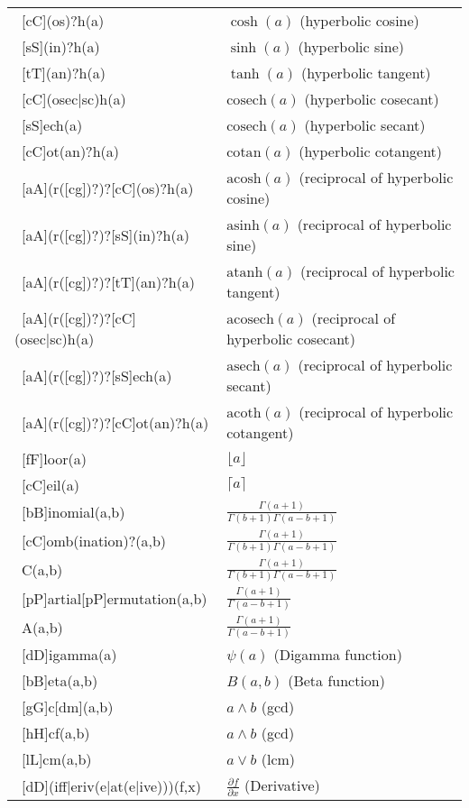 \begin{longtable}{ll}
    \ [cC](os)?h(a) & $\cosh(a)$ (hyperbolic cosine)\\
    \ [sS](in)?h(a) & $\sinh(a)$ (hyperbolic sine)\\
    \ [tT](an)?h(a) & $\tanh(a)$ (hyperbolic tangent)\\
    \ [cC](osec|sc)h(a) & $\mathrm{cosech}(a)$ (hyperbolic cosecant) \\
    \ [sS]ech(a) & $\mathrm{cosech}(a)$ (hyperbolic secant) \\
    \ [cC]ot(an)?h(a) & $\mathrm{cotan}(a)$ (hyperbolic cotangent) \\
    \ [aA](r([cg])?)?[cC](os)?h(a) & $\mathrm{acosh}(a)$ (reciprocal of hyperbolic cosine) \\
    \ [aA](r([cg])?)?[sS](in)?h(a) & $\mathrm{asinh}(a)$ (reciprocal of hyperbolic sine) \\
    \ [aA](r([cg])?)?[tT](an)?h(a) & $\mathrm{atanh}(a)$ (reciprocal of hyperbolic tangent) \\
    \ [aA](r([cg])?)?[cC](osec|sc)h(a) & $\mathrm{acosech}(a)$ (reciprocal of hyperbolic cosecant) \\
    \ [aA](r([cg])?)?[sS]ech(a) & $\mathrm{asech}(a)$ (reciprocal of hyperbolic secant) \\
    \ [aA](r([cg])?)?[cC]ot(an)?h(a) &  $\mathrm{acoth}(a)$ (reciprocal of hyperbolic cotangent)\\
    \ [fF]loor(a) & $\lfloor a \rfloor$ \\
    \ [cC]eil(a) & $\lceil a \rceil$ \\
    \ [bB]inomial(a,b) & $\frac{\Gamma(a+1)}{\Gamma(b+1)\Gamma(a-b+1)}$ \\
    \ [cC]omb(ination)?(a,b) & $\frac{\Gamma(a+1)}{\Gamma(b+1)\Gamma(a-b+1)}$ \\
    \ C(a,b) & $\frac{\Gamma(a+1)}{\Gamma(b+1)\Gamma(a-b+1)}$ \\
    \ [pP]artial[pP]ermutation(a,b) & $\frac{\Gamma(a+1)}{\Gamma(a-b+1)}$ \\
    \ A(a,b) & $\frac{\Gamma(a+1)}{\Gamma(a-b+1)}$ \\
    \ [dD]igamma(a) & $\psi(a)$ (Digamma function) \\
    \ [bB]eta(a,b) & $B(a,b)$ (Beta function) \\
    \ [gG]c[dm](a,b) & $a\wedge b$ (gcd) \\
    \ [hH]cf(a,b) & $a\wedge b$ (gcd) \\
    \ [lL]cm(a,b) & $a \vee b$ (lcm) \\
    \ [dD](iff|eriv(e|at(e|ive)))(f,x) & $\frac{\partial f}{\partial x}$ (Derivative) \\

\end{longtable}
